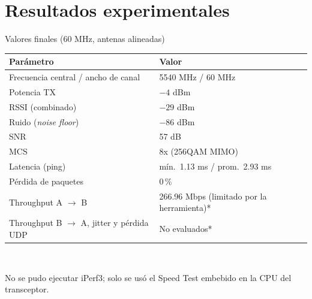 \renewcommand{\seccorta}{Resultados}
\section{Resultados experimentales}

\begin{frame}{Valores finales (60 MHz, antenas alineadas)}
  \centering\small
  \begin{tabular}{@{}ll@{}}
    \toprule
    \textbf{Parámetro} & \textbf{Valor} \\ \midrule
    Frecuencia central / ancho de canal & 5540 MHz / 60 MHz \\
    Potencia TX & $-4$ dBm \\
    RSSI (combinado) & $-29$ dBm \\
    Ruido (\emph{noise floor}) & $-86$ dBm \\
    SNR & 57 dB \\
    MCS & 8x (256QAM MIMO) \\
    Latencia (ping) & mín.\ 1.13 ms / prom.\ 2.93 ms \\
    Pérdida de paquetes & 0\,\% \\
    Throughput A $\to$ B & 266.96 Mbps (limitado por la herramienta)* \\
    Throughput B $\to$ A, jitter y pérdida UDP & No evaluados* \\
    \bottomrule
  \end{tabular}\\[4pt]
  \raggedright\scriptsize *No se pudo ejecutar iPerf3; solo se usó el Speed Test embebido en la CPU del transceptor.
\end{frame}
